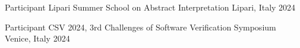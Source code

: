 
\begin{cvhonors}

  	\cvhonor
	{Participant}
	{Lipari Summer School on Abstract Interpretation}
	{Lipari, Italy}
	{2024}

	\cvhonor
	{Participant}
	{CSV 2024, 3rd Challenges of Software Verification Symposium}
	{Venice, Italy} %
	{2024} %

\end{cvhonors}
